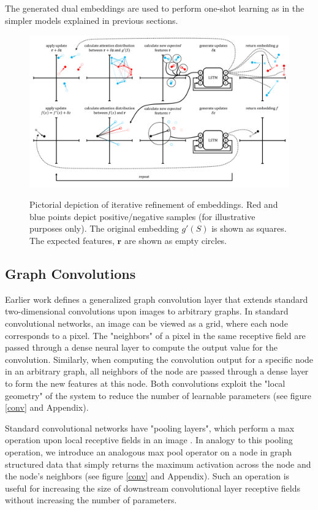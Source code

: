 \documentclass[journal=jacsat,manuscript=article]{achemso}
\begin{document}
The generated dual embeddings are used to perform one-shot learning as in the simpler models explained in previous sections.
\begin{figure}
\includegraphics[width=\textwidth]{resiembedding_graphic.png}
\label{fig:resiembed}
\caption{Pictorial depiction of iterative refinement of embeddings. Red and blue points depict positive/negative samples (for illustrative purposes only). The original embedding $g'(S)$ is shown as squares. The expected features, $\mathbf{r}$ are shown as empty circles.}
\end{figure}


\subsection{Graph Convolutions}
Earlier work \cite{duvenaud2015convolutional} defines a generalized graph convolution layer that extends standard two-dimensional convolutions upon images to arbitrary graphs. In standard convolutional networks, an image can be viewed as a grid, where each node corresponds to a pixel. The "neighbors" of a pixel in the same receptive field are passed through a dense neural layer to compute the output value for the convolution\cite{karpathy231n}. Similarly, when computing the convolution output for a specific node in an arbitrary graph, all neighbors of the node are passed through a dense layer to form the new features at this node. Both convolutions exploit the "local geometry" of the system to reduce the number of learnable parameters (see figure \ref{conv} and Appendix).

Standard convolutional networks have "pooling layers", which perform a max operation upon local receptive fields in an image \cite{karpathy231n}. In analogy to this pooling operation, we introduce an analogous max pool operator on a node in graph structured data that simply returns the maximum activation across the node and the node's neighbors (see figure \ref{conv} and Appendix). Such an operation is useful for increasing the size of downstream convolutional layer receptive fields without increasing the number of parameters.
\end{document}
